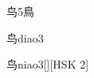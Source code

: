 \begin{entry}{鸟}{5}{⿃}
  \begin{phonetics}{鸟}{diao3}
  \end{phonetics}
  \begin{phonetics}{鸟}{niao3}[][HSK 2]
  \end{phonetics}
\end{entry}
